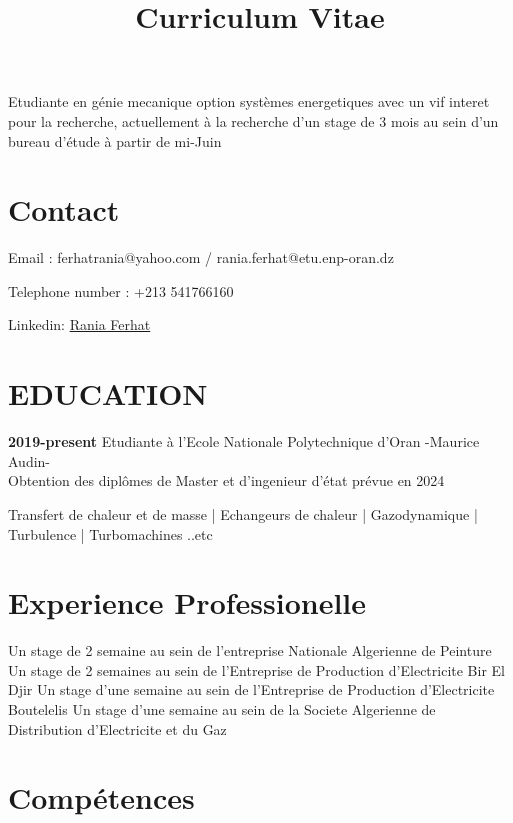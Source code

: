 \documentclass[a4paper]{moderncv}
\title{Curriculum Vitae}
\begin{document}
 \maketitle
 \begin{center}
 {\large Etudiante en génie mecanique option systèmes energetiques avec un vif interet pour la recherche, actuellement à la recherche d'un stage de 3 mois au sein d'un bureau d'étude  à partir de mi-Juin}
 \end{center}
 \vspace{1cm}
 \section{Contact}
 Email : ferhatrania@yahoo.com / rania.ferhat@etu.enp-oran.dz
 
 Telephone number : +213 541766160
 
Linkedin: \href{www.linkedin.com/rania-ferhat/}{Rania Ferhat}
 
\vspace{0.5cm}

\section{\textbf{EDUCATION}}
\textbf{2019-present} Etudiante à l'Ecole Nationale Polytechnique d'Oran -Maurice Audin- \\
Obtention des diplômes de Master et d'ingenieur d'état prévue en 2024 
		
 {Transfert de chaleur et de masse | Echangeurs de chaleur | Gazodynamique | Turbulence | Turbomachines ..etc }
		
\vspace{0.5cm}
\section{\textbf{Experience Professionelle}}
 {Un stage de 2 semaine au sein de l'entreprise Nationale Algerienne de Peinture}{}{}{}{}
 {Un stage de 2 semaines au sein de l'Entreprise de Production d'Electricite Bir El Djir}{}{}{}{}
 {Un stage d'une semaine au sein de l'Entreprise de Production d'Electricite Boutelelis}{}{}{}{}
 {Un stage d'une semaine au sein de la Societe Algerienne de Distribution d'Electricite et du Gaz}{}{}{}{}


			
\vspace{0.7cm}	
\section{\textbf{Compétences}}
\end{document}
